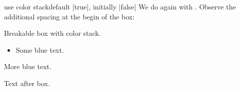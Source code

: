 \begin{docTcbKey}[][doc new=2020-10-09]{use color stack}{}{default |true|, initially |false|}
We do again with . Observe the additional spacing
at the begin of the box:

\begin{dispExample}
\begin{multicols}{2}\footnotesize
Breakable box with color stack.
\begin{tcolorbox}[enhanced jigsaw, use color stack,
  size=small, colframe=gray, colback=yellow!10!white, colupper=blue,
  enforce breakable,%
  vfill before first, pad at break=1mm, break at=3.3cm ]
    \begin{itemize}\item Some blue text.\end{itemize}
    {\color{red}\itshape\lipsum[2]}\par
    More blue text.
\end{tcolorbox}
Text after box.
\end{multicols}
\end{dispExample}

\end{docTcbKey}